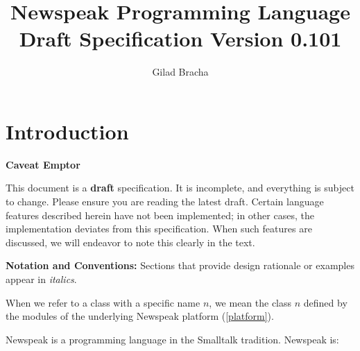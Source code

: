 \documentclass{article}
\title{Newspeak Programming Language Draft Specification Version 0.101}
\author{Gilad Bracha}
\begin{document}
\maketitle
\tableofcontents

\section{Introduction}

{\em

 {\bf Caveat Emptor}
 
This document is a {\bf  draft} specification. It is incomplete, and everything is subject to change. Please ensure you are reading the latest draft. Certain language features described herein have not been implemented; in other cases, the implementation deviates from this specification. When such features are discussed, we will endeavor to note this clearly in the text.

}


{\bf Notation and Conventions:} Sections that provide design rationale or examples appear in {\em italics}. 

When we refer to a class with a specific name $n$, we mean the class $n$ defined by the modules of the underlying Newspeak platform (\ref{platform}).

Newspeak is a programming language in the Smalltalk \cite{GoldbergRobson83} tradition.  
Newspeak is:
\end{document}
